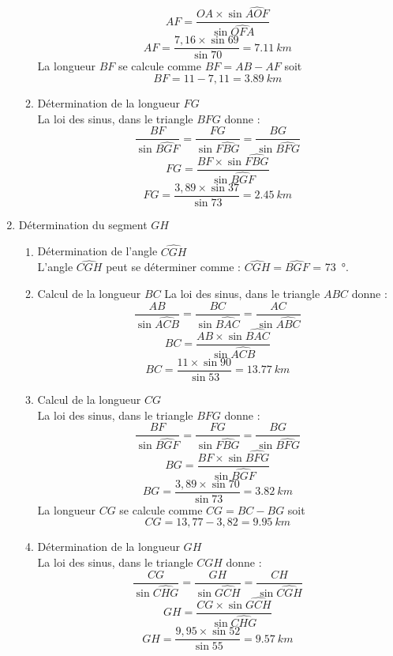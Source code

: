 \documentclass[a4paper,12pt,fleqn]{article}%
\begin{document}
\begin{multicols}{2}
\begin{enumerate}
\begin{enumerate}
             $$AF = \dfrac{OA \times \sin{\widehat{AOF}}}{\sin{\widehat{OFA}}}$$
            $$AF = \dfrac{7,16 \times \sin{69}}{\sin{70}} = \SI{7,11}{km}$$
            La longueur $BF$ se calcule comme $BF=AB-AF$ soit $$BF=11-7,11=\SI{3,89}{km}$$
            \item Détermination de la longueur $FG$\\
            La loi des sinus, dans le triangle $BFG$ donne : $$\dfrac{BF}{\sin{\widehat{BGF}}} = \dfrac{FG}{\sin{\widehat{FBG}}} = \dfrac{BG}{\sin{\widehat{BFG}}}$$
            $$FG = \dfrac{BF \times \sin{\widehat{FBG}}}{\sin{\widehat{BGF}}}$$
            $$FG = \dfrac{3,89 \times \sin{37}}{\sin{73}} = \SI{2,45}{km}$$
        \end{enumerate}
    \item Détermination du segment $GH$
        \begin{enumerate}
            \item Détermination de l'angle $\widehat{CGH}$\\
            L'angle $\widehat{CGH}$ peut se déterminer comme : $\widehat{CGH} = \widehat{BGF}$ = \SI{73}{\degree}.
            \item Calcul de la longueur $BC$
             La loi des sinus, dans le triangle $ABC$ donne : $$\dfrac{AB}{\sin{\widehat{ACB}}} = \dfrac{BC}{\sin{\widehat{BAC}}}=\dfrac{AC}{\sin{\widehat{ABC}}}$$
             $$BC=\dfrac{AB \times \sin{\widehat{BAC}}}{\sin{\widehat{ACB}}}$$
             $$BC=\dfrac{11 \times \sin{90}}{\sin{53}}=\SI{13,77}{km}$$
            \item Calcul de la longueur $CG$\\
            La loi des sinus, dans le triangle $BFG$ donne : $$\dfrac{BF}{\sin{\widehat{BGF}}} = \dfrac{FG}{\sin{\widehat{FBG}}} = \dfrac{BG}{\sin{\widehat{BFG}}}$$
            $$BG = \dfrac{BF \times \sin{\widehat{BFG}}}{\sin{\widehat{BGF}}}$$
            $$BG = \dfrac{3,89 \times \sin{70}}{\sin{73}} = \SI{3,82}{km}$$
            La longueur $CG$ se calcule comme $CG=BC-BG$ soit $$CG = 13,77 - 3,82 = \SI{9,95}{km}$$
            \item Détermination de la longueur $GH$\\
            La loi des sinus, dans le triangle $CGH$ donne : $$\dfrac{CG}{\sin{\widehat{CHG}}}=\dfrac{GH}{\sin{\widehat{GCH}}}=\dfrac{CH}{\sin{\widehat{CGH}}}$$
            $$GH=\dfrac{CG\times \sin{\widehat{GCH}}}{\sin{\widehat{CHG}}}$$
            $$GH=\dfrac{9,95\times \sin{52}}{\sin{55}}=\SI{9,57}{km}$$
        \end{enumerate}

\end{enumerate}
\end{multicols}
\end{document}

